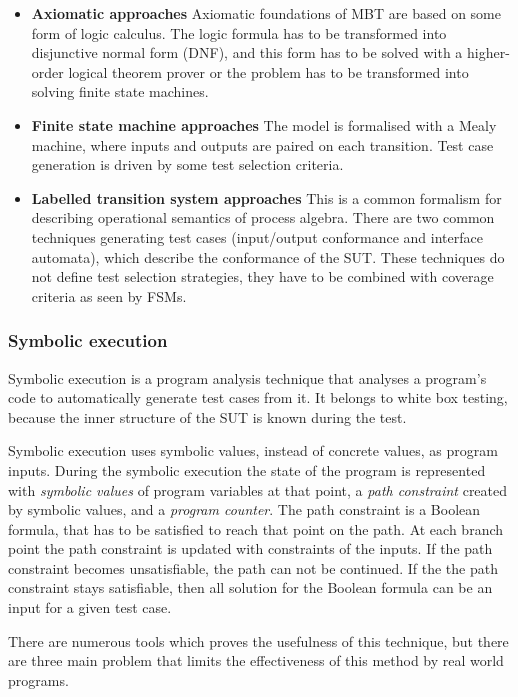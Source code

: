 \begin{itemize}
	\item \textbf{Axiomatic approaches} Axiomatic foundations of MBT are based on some form of logic calculus. The logic formula has to be transformed into disjunctive normal form (DNF), and this form has to be solved with a higher-order logical theorem prover or the problem has to be transformed into solving finite state machines.
	\item \textbf{Finite state machine approaches} The model is formalised with a Mealy machine, where inputs and outputs are paired on each transition. Test case generation is driven by some test selection criteria.
	\item \textbf{Labelled transition system approaches} This is a common formalism for describing operational semantics of process algebra. There are two common techniques generating test cases (input/output conformance and interface automata), which describe the conformance of the SUT. These techniques do not define test selection strategies, they have to be combined with coverage criteria as seen by FSMs.
\end{itemize}


\subsubsection{Symbolic execution}
\label{ssub:symbolicexecution}

Symbolic execution is a program analysis technique that analyses a program’s code to automatically generate test cases from it. It belongs to white box testing, because the inner structure of the SUT is known during the test.

Symbolic execution uses symbolic values, instead of concrete values, as program inputs. During the symbolic execution the state of the program is represented with \textit{symbolic values} of program variables at that point, a \textit{path constraint} created by symbolic values, and a \textit{program counter}. The path constraint is a Boolean formula, that has to be satisfied to reach that point on the path. At each branch point the path constraint is updated with constraints of the inputs. If the path constraint becomes unsatisfiable, the path can not be continued. If the the path constraint stays satisfiable, then all solution for the Boolean formula can be an input for a given test case.

There are numerous tools which proves the usefulness of this technique, but there are three main problem that limits the effectiveness of this method by real world programs.

